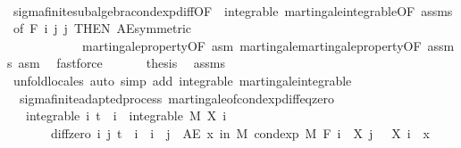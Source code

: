 \begin{isabellebody}
\ \ \ \ \ \ \isamarkupfalse%
\ sigma{\isacharunderscore}{\kern0pt}finite{\isacharunderscore}{\kern0pt}subalgebra{\isachardot}{\kern0pt}cond{\isacharunderscore}{\kern0pt}exp{\isacharunderscore}{\kern0pt}diff{\isacharbrackleft}{\kern0pt}OF\ {\isacharunderscore}{\kern0pt}\ integrable\ martingale{\isachardot}{\kern0pt}integrable{\isacharbrackleft}{\kern0pt}OF\ assms{\isacharbrackright}{\kern0pt}{\isacharcomma}{\kern0pt}\ of\ {\isachardoublequoteopen}F\ i{\isachardoublequoteclose}\ j\ j{\isacharcomma}{\kern0pt}\ THEN\ AE{\isacharunderscore}{\kern0pt}symmetric{\isacharbrackright}{\kern0pt}\ \isanewline
\ \ \ \ \ \ \ \ \ \ \ \ martingale{\isacharunderscore}{\kern0pt}property{\isacharbrackleft}{\kern0pt}OF\ asm{\isacharbrackright}{\kern0pt}\ martingale{\isachardot}{\kern0pt}martingale{\isacharunderscore}{\kern0pt}property{\isacharbrackleft}{\kern0pt}OF\ assms\ asm{\isacharbrackright}{\kern0pt}\ \isamarkupfalse%
\ fastforce\isanewline
\ \ \isacommand{{\isacharbraceright}{\kern0pt}}\isamarkupfalse%
\isanewline
\ \ \isamarkupfalse%
\ {\isacharquery}{\kern0pt}thesis\ \isamarkupfalse%
\ assms\ \isamarkupfalse%
\ {\isacharparenleft}{\kern0pt}unfold{\isacharunderscore}{\kern0pt}locales{\isacharparenright}{\kern0pt}\ {\isacharparenleft}{\kern0pt}auto\ simp\ add{\isacharcolon}{\kern0pt}\ integrable\ martingale{\isachardot}{\kern0pt}integrable{\isacharparenright}{\kern0pt}\ \ \isanewline
{}\isamarkupfalse%
%
\endisatagproof
{\isafoldproof}%
%
\isadelimproof
\isanewline
%
\endisadelimproof
\isanewline
{}\isamarkupfalse%
\isanewline
\isanewline
{}\isamarkupfalse%
\ {\isacharparenleft}{\kern0pt}\ sigma{\isacharunderscore}{\kern0pt}finite{\isacharunderscore}{\kern0pt}adapted{\isacharunderscore}{\kern0pt}process{\isacharparenright}{\kern0pt}\ martingale{\isacharunderscore}{\kern0pt}of{\isacharunderscore}{\kern0pt}cond{\isacharunderscore}{\kern0pt}exp{\isacharunderscore}{\kern0pt}diff{\isacharunderscore}{\kern0pt}eq{\isacharunderscore}{\kern0pt}zero{\isacharcolon}{\kern0pt}\ \isanewline
\ \ \ integrable{\isacharcolon}{\kern0pt}\ {\isachardoublequoteopen}{\isasymAnd}i{\isachardot}{\kern0pt}\ t\ {\isasymle}\ i\ {\isasymLongrightarrow}\ integrable\ M\ {\isacharparenleft}{\kern0pt}X\ i{\isacharparenright}{\kern0pt}{\isachardoublequoteclose}\ \isanewline
\ \ \ \ \ \ \ diff{\isacharunderscore}{\kern0pt}zero{\isacharcolon}{\kern0pt}\ {\isachardoublequoteopen}{\isasymAnd}i\ j{\isachardot}{\kern0pt}\ t\ {\isasymle}\ i\ {\isasymLongrightarrow}\ i\ {\isasymle}\ j\ {\isasymLongrightarrow}\ AE\ x\ in\ M{\isachardot}{\kern0pt}\ cond{\isacharunderscore}{\kern0pt}exp\ M\ {\isacharparenleft}{\kern0pt}F\ i{\isacharparenright}{\kern0pt}\ {\isacharparenleft}{\kern0pt}{\isasymlambda}{\isasymxi}{\isachardot}{\kern0pt}\ X\ j\ {\isasymxi}\ {\isacharminus}{\kern0pt}\ X\ i\ {\isasymxi}{\isacharparenright}{\kern0pt}\ x\ {\isacharequal}{\kern0pt}\ {}{\isachardoublequoteclose}\isanewline

\end{isabellebody}
